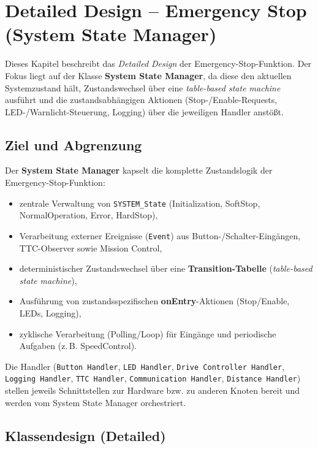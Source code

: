 \newpage
\section{Detailed Design -- Emergency Stop (System State Manager)}
\label{sec:detailed_design}

Dieses Kapitel beschreibt das \emph{Detailed Design} der Emergency-Stop-Funktion. Der Fokus liegt auf der Klasse
\textbf{System State Manager}, da diese den aktuellen Systemzustand hält, Zustandswechsel über eine
\emph{table-based state machine} ausführt und die zustandsabhängigen Aktionen (Stop-/Enable-Requests, LED-/Warnlicht-Steuerung,
Logging) über die jeweiligen Handler anstößt.

\subsection{Ziel und Abgrenzung}
Der \textbf{System State Manager} kapselt die komplette Zustandslogik der Emergency-Stop-Funktion:
\begin{itemize}[leftmargin=*, itemsep=2pt]
  \item zentrale Verwaltung von \texttt{SYSTEM\_State} (Initialization, SoftStop, NormalOperation, Error, HardStop),
  \item Verarbeitung externer Ereignisse (\texttt{Event}) aus Button-/Schalter-Eingängen, TTC-Observer sowie Mission Control,
  \item deterministischer Zustandswechsel über eine \textbf{Transition-Tabelle} (\emph{table-based state machine}),
  \item Ausführung von zustandsspezifischen \textbf{onEntry}-Aktionen (Stop/Enable, LEDs, Logging),
  \item zyklische Verarbeitung (Polling/Loop) für Eingänge und periodische Aufgaben (z.\,B. SpeedControl).
\end{itemize}

Die Handler (\texttt{Button Handler}, \texttt{LED Handler}, \texttt{Drive Controller Handler},\\ \texttt{Logging Handler},
\texttt{TTC Handler}, \texttt{Communication Handler}, \texttt{Distance Handler}) stellen jeweils Schnittstellen zur Hardware bzw.
zu anderen Knoten bereit und werden vom System State Manager orchestriert.

\subsection{Klassendesign (Detailed)}
